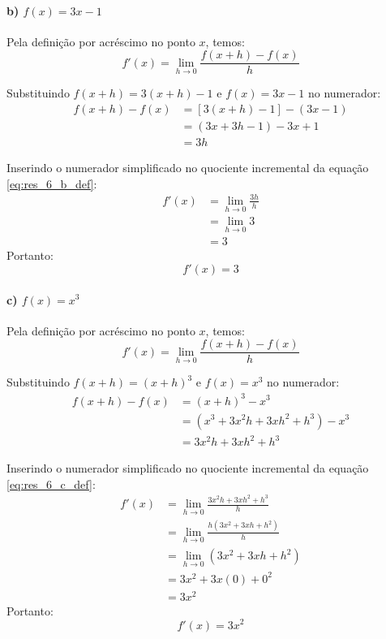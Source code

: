 \setcounter{equation}{0}
\paragraph{b) $f(x) = 3x - 1$}

Pela definição por acréscimo no ponto $x$, temos:
\begin{equation}
f'(x) = \lim_{h \to 0} \frac{f(x + h) - f(x)}{h} \label{eq:res_6_b_def}
\end{equation}

Substituindo $f(x + h) = 3(x + h) - 1$ e $f(x) = 3x - 1$ no numerador:
\begin{align*}
f(x + h) - f(x) &= [3(x + h) - 1] - (3x - 1) \\
&= (3x + 3h - 1) - 3x + 1 \\
&= 3h
\end{align*}

Inserindo o numerador simplificado no quociente incremental da equação \eqref{eq:res_6_b_def}:
\begin{align*}
f'(x) &= \lim_{h \to 0} \frac{3h}{h} \\
      &= \lim_{h \to 0} 3 \\
      &= 3
\end{align*}
Portanto:
\[
  f'(x) = 3
\]

\setcounter{equation}{0}
\paragraph{c) $f(x) = x^3$}

Pela definição por acréscimo no ponto $x$, temos:
\begin{equation}
f'(x) = \lim_{h \to 0} \frac{f(x + h) - f(x)}{h} \label{eq:res_6_c_def}
\end{equation}

Substituindo $f(x + h) = (x + h)^3$ e $f(x) = x^3$ no numerador:
\begin{align*}
f(x + h) - f(x) &= (x + h)^3 - x^3 \\
&= (x^3 + 3x^2h + 3xh^2 + h^3) - x^3 \\
&= 3x^2h + 3xh^2 + h^3
\end{align*}

Inserindo o numerador simplificado no quociente incremental da equação \eqref{eq:res_6_c_def}:
\begin{align*}
f'(x) &= \lim_{h \to 0} \frac{3x^2h + 3xh^2 + h^3}{h} \\
      &= \lim_{h \to 0} \frac{h(3x^2 + 3xh + h^2)}{h} \\
      &= \lim_{h \to 0} (3x^2 + 3xh + h^2) \\
      &= 3x^2 + 3x(0) + 0^2 \\
      &= 3x^2
\end{align*}
Portanto:
\[
  f'(x) = 3x^2
\]

